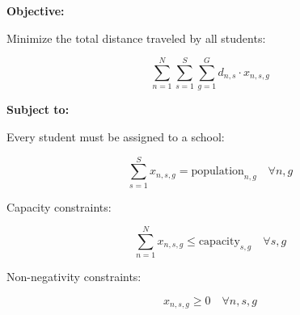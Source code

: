 \documentclass{article}
\begin{document}
\textbf{Objective:}

Minimize the total distance traveled by all students:

\[
\sum_{n=1}^{N} \sum_{s=1}^{S} \sum_{g=1}^{G} d_{n,s} \cdot x_{n,s,g}
\]

\textbf{Subject to:}

Every student must be assigned to a school:

\[
\sum_{s=1}^{S} x_{n,s,g} = \text{population}_{n,g} \quad \forall n, g
\]

Capacity constraints:

\[
\sum_{n=1}^{N} x_{n,s,g} \leq \text{capacity}_{s,g} \quad \forall s, g
\]

Non-negativity constraints:

\[
x_{n,s,g} \geq 0 \quad \forall n, s, g
\]
\end{document}

